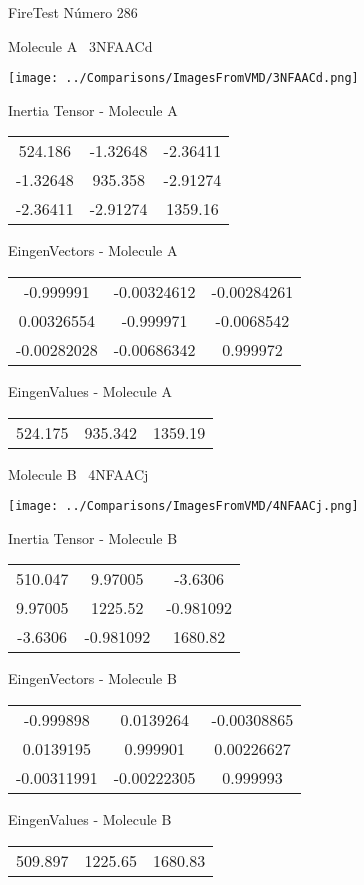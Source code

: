 \vtab[-3cm]
\begin{center}
{\large FireTest \tab Número 286}
\end{center}
\begin{multicols}{2}
\begin{center}

Molecule A \
3NFAACd

\texttt{[image: ../Comparisons/ImagesFromVMD/3NFAACd.png]}

Inertia Tensor - Molecule A \\
\begin{tabular}{|c c c|}
524.186	 & 	-1.32648	 & 	-2.36411	 \\
-1.32648	 & 	935.358	 & 	-2.91274	 \\
-2.36411	 & 	-2.91274	 & 	1359.16
\end{tabular}

\vtab
 EingenVectors - Molecule A     \\
\begin{tabular}{|c c c|}
-0.999991	 & 	-0.00324612	 & 	-0.00284261	 \\
0.00326554	 & 	-0.999971	 & 	-0.0068542	 \\
-0.00282028	 & 	-0.00686342	 & 	0.999972
\end{tabular}

\vtab
 EingenValues - Molecule A     \\
\begin{tabular}{|c c c|}
524.175	 & 	935.342	 & 	1359.19	 \\
\end{tabular}
\columnbreak

Molecule B \
4NFAACj

\texttt{[image: ../Comparisons/ImagesFromVMD/4NFAACj.png]}

Inertia Tensor - Molecule B \\
\begin{tabular}{|c c c|}
510.047	 & 	9.97005	 & 	-3.6306	 \\
9.97005	 & 	1225.52	 & 	-0.981092	 \\
-3.6306	 & 	-0.981092	 & 	1680.82
\end{tabular}

\vtab
 EingenVectors - Molecule B     \\
\begin{tabular}{|c c c|}
-0.999898	 & 	0.0139264	 & 	-0.00308865	 \\
0.0139195	 & 	0.999901	 & 	0.00226627	 \\
-0.00311991	 & 	-0.00222305	 & 	0.999993
\end{tabular}

\vtab
 EingenValues - Molecule B     \\
\begin{tabular}{|c c c|}
509.897	 & 	1225.65	 & 	1680.83	 \\
\end{tabular}

\end{center}
\end{multicols}

